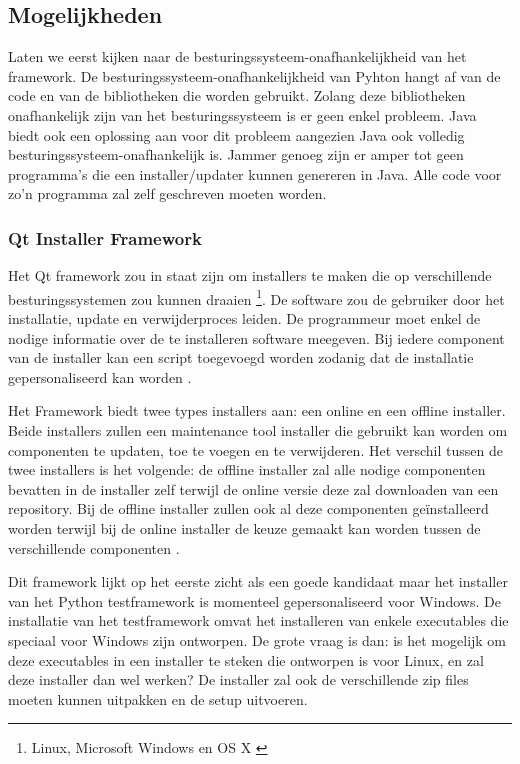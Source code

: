\documentclass{article}
\begin{document}
\subsection{Mogelijkheden}\label{section:mogelijkheden}
Laten we eerst kijken naar de besturingssysteem-onafhankelijkheid van het framework.
De besturingssysteem-onafhankelijkheid van Pyhton hangt af van de code en van de bibliotheken die worden gebruikt.
Zolang deze bibliotheken onafhankelijk zijn van het besturingssysteem is er geen enkel probleem.
Java biedt ook een oplossing aan voor dit probleem aangezien Java ook volledig besturingssysteem-onafhankelijk is.
Jammer genoeg zijn er amper tot geen programma's die een installer/updater kunnen genereren in Java.
Alle code voor zo'n programma zal zelf geschreven moeten worden.

\subsubsection{Qt Installer Framework \citep{qtDoc}}
Het Qt framework zou in staat zijn om installers te maken die op verschillende besturingssystemen zou kunnen draaien \footnote{Linux, Microsoft Windows en OS X \citep{qtOverview}}.
De software zou de gebruiker door het installatie, update en verwijderproces leiden.
De programmeur moet enkel de nodige informatie over de te installeren software meegeven.
Bij iedere component van de installer kan een script toegevoegd worden zodanig dat de installatie gepersonaliseerd kan worden \citep{qtDocScript}.

Het Framework biedt twee types installers aan: een online en een offline installer.
Beide installers zullen een maintenance tool installer die gebruikt kan worden om componenten te updaten, toe te voegen en te verwijderen.
Het verschil tussen de twee installers is het volgende: de offline installer zal alle nodige componenten bevatten in de installer zelf terwijl de online versie deze zal downloaden van een repository.
Bij de offline installer zullen ook al deze componenten ge\"installeerd worden terwijl bij de online installer de keuze gemaakt kan worden tussen de verschillende componenten \citep{qtOverview}.

Dit framework lijkt op het eerste zicht als een goede kandidaat maar het installer van het Python testframework is momenteel gepersonaliseerd voor Windows.
De installatie van het testframework omvat het installeren van enkele executables die speciaal voor Windows zijn ontworpen.
De grote vraag is dan: is het mogelijk om deze executables in een installer te steken die ontworpen is voor Linux, en zal deze installer dan wel werken?
De installer zal ook de verschillende zip files moeten kunnen uitpakken en de setup uitvoeren.
\end{document}

